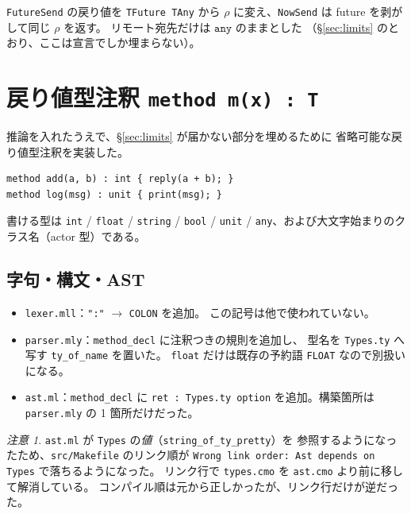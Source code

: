 \documentclass[11pt,a4paper]{ltjsarticle}
\theoremstyle{definition}
\theoremstyle{remark}
\newtheorem{remark}{注意}
\newcommand{\ty}[1]{\ensuremath{\mathtt{#1}}}
\begin{document}
\texttt{FutureSend} の戻り値を \texttt{TFuture TAny} から
$\rho$ に変え、\texttt{NowSend} は future を剥がして同じ $\rho$ を返す。
リモート宛先だけは \ty{any} のままとした
（\S\ref{sec:limits} のとおり、ここは宣言でしか埋まらない）。

\section{戻り値型注釈 \texttt{method m(x) : T}}
\label{sec:annotation}

推論を入れたうえで、\S\ref{sec:limits} が届かない部分を埋めるために
省略可能な戻り値型注釈を実装した。

\begin{lstlisting}[language=AIPL]
method add(a, b) : int { reply(a + b); }
method log(msg) : unit { print(msg); }
\end{lstlisting}

書ける型は \texttt{int} / \texttt{float} / \texttt{string} / \texttt{bool} /
\texttt{unit} / \texttt{any}、および大文字始まりのクラス名（actor 型）である。

\subsection{字句・構文・AST}

\begin{itemize}
\item \texttt{lexer.mll}：\texttt{":"} $\to$ \texttt{COLON} を追加。
  この記号は他で使われていない。
\item \texttt{parser.mly}：\texttt{method\_decl} に注釈つきの規則を追加し、
  型名を \texttt{Types.ty} へ写す \texttt{ty\_of\_name} を置いた。
  \texttt{float} だけは既存の予約語 \texttt{FLOAT} なので別扱いになる。
\item \texttt{ast.ml}：\texttt{method\_decl} に \texttt{ret : Types.ty option}
  を追加。構築箇所は \texttt{parser.mly} の 1 箇所だけだった。
\end{itemize}

\begin{remark}
\texttt{ast.ml} が \texttt{Types} の\emph{値}（\texttt{string\_of\_ty\_pretty}）を
参照するようになったため、\texttt{src/Makefile} のリンク順が
\texttt{Wrong link order: Ast depends on Types} で落ちるようになった。
リンク行で \texttt{types.cmo} を \texttt{ast.cmo} より前に移して解消している。
コンパイル順は元から正しかったが、リンク行だけが逆だった。
\end{remark}
\end{document}
